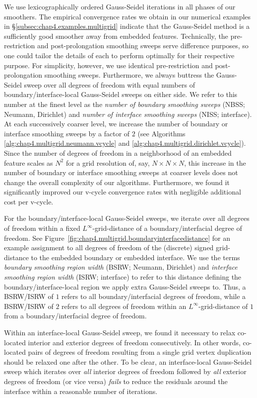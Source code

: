 We use lexicographically ordered Gauss-Seidel iterations in all phases of our smoothers. The empirical convergence rates we obtain in our numerical examples in \S\ref{subsec:chap4.examples.multigrid} indicate that the Gauss-Seidel method is a sufficiently good smoother away from embedded features. Technically, the pre-restriction and post-prolongation smoothing sweeps serve difference purposes, so one could tailor the details of each to perform optimally for their respective purpose. For simplicity, however, we use identical pre-restriction and post-prolongation smoothing sweeps. Furthermore, we always buttress the Gauss-Seidel sweep over all degrees of freedom with equal numbers of boundary/interface-local Gauss-Seidel sweeps on either side. We refer to this number at the finest level as the \emph{number of boundary smoothing sweeps} (NBSS; Neumann, Dirichlet) and \emph{number of interface smoothing sweeps} (NISS; interface). At each successively coarser level, we increase the number of boundary or interface smoothing sweeps by a factor of $2$ (see Algorithms \ref{alg:chap4.multigrid.neumann.vcycle} and \ref{alg:chap4.multigrid.dirichlet.vcycle}). Since the number of degrees of freedom in a neighborhood of an embedded feature scales as $N^2$ for a grid resolution of, say, $N \times N \times N$, this increase in the number of boundary or interface smoothing sweeps at coarser levels does not change the overall complexity of our algorithms. Furthermore, we found it significantly improved our v-cycle convergence rates with negligible additional cost per v-cycle.

For the boundary/interface-local Gauss-Seidel sweeps, we iterate over all degrees of freedom within a fixed $L^{\infty}$-grid-distance of a boundary/interfacial degree of freedom. See Figure~\ref{fig:chap4.multigrid.boundaryinterfacedistance} for an example assignment to all degrees of freedom of the (discrete) signed grid-distance to the embedded boundary or embedded interface. We use the terms \emph{boundary smoothing region width} (BSRW; Neumann, Dirichlet) and \emph{interface smoothing region width} (ISRW; interface) to refer to this distance defining the boundary/interface-local region we apply extra Gauss-Seidel sweeps to. Thus, a BSRW/ISRW of $1$ refers to all boundary/interfacial degrees of freedom, while a BSRW/ISRW of $2$ refers to all degrees of freedom within an $L^{\infty}$-grid-distance of $1$ from a boundary/interfacial degree of freedom.

Within an interface-local Gauss-Seidel sweep, we found it necessary to relax co-located interior and exterior degrees of freedom consecutively. In other words, co-located pairs of degrees of freedom resulting from a single grid vertex duplication should be relaxed one after the other. To be clear, an interface-local Gauss-Seidel sweep which iterates over \emph{all} interior degrees of freedom followed by \emph{all} exterior degrees of freedom (or vice versa) \emph{fails} to reduce the residuals around the interface within a reasonable number of iterations.

